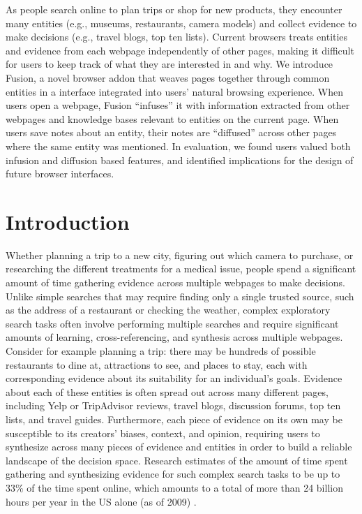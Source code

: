 As people search online to plan trips or shop for new products, they encounter many entities (e.g., museums, restaurants, camera models) and collect evidence to make decisions (e.g., travel blogs, top ten lists). Current browsers treats entities and evidence from each webpage independently of other pages, making it difficult for users to keep track of what they are interested in and why. We introduce Fusion, a novel browser addon that weaves pages together through common entities in a interface integrated into users' natural browsing experience. When users open a webpage, Fusion ``infuses'' it with information extracted from other webpages and knowledge bases relevant to entities on the current page. When users save notes about an entity, their notes are ``diffused'' across other pages where the same entity was mentioned. In evaluation, we found users valued both infusion and diffusion based features, and identified implications for the design of future browser interfaces.


\section{Introduction}

Whether planning a trip to a new city, figuring out which camera to purchase, or researching the different treatments for a medical issue, people spend a significant amount of time gathering evidence across multiple webpages to make decisions. Unlike simple searches that may require finding only a single trusted source, such as the address of a restaurant or checking the weather, complex exploratory search tasks often involve performing multiple searches and require significant amounts of learning, cross-referencing, and synthesis across multiple webpages. Consider for example planning a trip: there may be hundreds of possible restaurants to dine at, attractions to see, and places to stay, each with corresponding evidence about its suitability for an individual's goals. Evidence about each of these entities is often spread out across many different pages, including Yelp or TripAdvisor reviews, travel blogs, discussion forums, top ten lists, and travel guides. Furthermore, each piece of evidence on its own may be susceptible to its creators' biases, context, and opinion, requiring users to synthesize across many pieces of evidence and entities in order to build a reliable landscape of the decision space. Research estimates of the amount of time spent gathering and synthesizing evidence for such complex search tasks to be up to 33\% of the time spent online, which amounts to a total of more than 24 billion hours per year in the US alone (as of 2009) \cite{mar2006exp,kellar2007field,rose2004understanding,forrester}.

